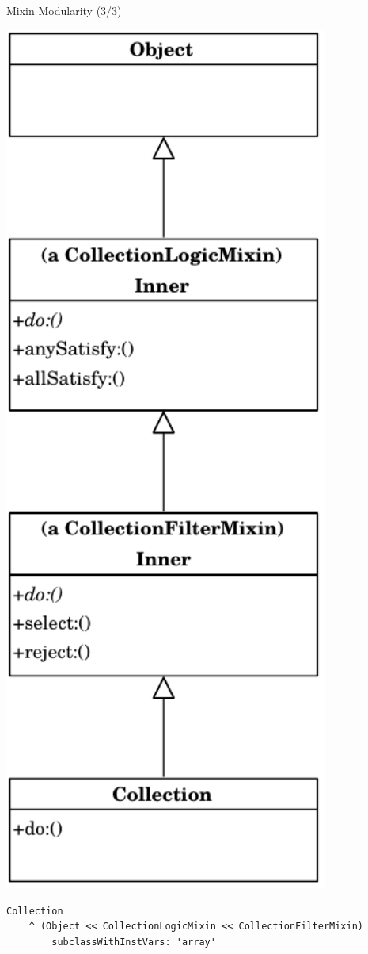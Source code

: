 \documentclass[xcolor=dvipsname, handout]{beamer} %
\begin{document}
\begin{frame}[fragile]{Mixin Modularity (3/3)}
\begin{minipage}{0.3\textwidth}
\centering
\includegraphics[width=0.8\textwidth]{mixin_2.pdf}
\end{minipage} %
\begin{minipage}{0.65\textwidth}
\begin{lstlisting}
Collection
    ^ (Object << CollectionLogicMixin << CollectionFilterMixin)
        subclassWithInstVars: 'array'
\end{lstlisting}
\end{minipage}
\end{frame}
\end{document}
